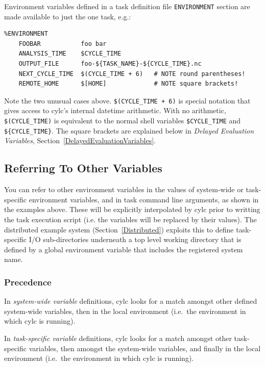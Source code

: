 \documentclass[11pt,a4paper]{article}
\begin{document}
Environment variables defined in a task definition file
\lstinline=ENVIRONMENT= section are made available
to just the one task, e.g.:

\begin{lstlisting}
%ENVIRONMENT
    FOOBAR           foo bar
    ANALYSIS_TIME    $CYCLE_TIME
    OUTPUT_FILE      foo-${TASK_NAME}-${CYCLE_TIME}.nc
    NEXT_CYCLE_TIME  $(CYCLE_TIME + 6)   # NOTE round parentheses!
    REMOTE_HOME      $[HOME]             # NOTE square brackets!
\end{lstlisting}

\lstset{language=bash}

Note the two unusual cases above. \lstinline=$(CYCLE_TIME + 6)= is 
special notation that gives access to cylc's internal datetime arithmetic.
With no arithmetic, \lstinline=$(CYCLE_TIME)= is equivalent to 
the normal shell variables \lstinline=$CYCLE_TIME= and
\lstinline=${CYCLE_TIME}=. The square brackets are explained 
below in {\em Delayed Evaluation Variables},
Section~\ref{DelayedEvaluationVariables}.

\subsection{Referring To Other Variables}
\label{ReferringToOtherVariables}

\lstset{language=bash}

You can refer to other environment variables in the values of
system-wide or task-specific environment variables, and in task command
line arguments, as shown in the examples above. These will be explicitly
interpolated by cylc prior to writting the task execution script (i.e.
the variables will be replaced by their values). The distributed example
system (Section~\ref{Distributed}) exploits this to define task-specific
I/O sub-directories underneath a top level working directory that is
defined by a global environment variable that includes the registered
system name.

\subsubsection{Precedence}

In {\em system-wide variable} definitions, cylc looks for a match
amongst other defined system-wide variables, then in the local
environment (i.e.\ the environment in which cylc is running).

In {\em task-specific variable} definitions, cylc looks for a match
amongst other task-specific variables, then amongst the system-wide
variables, and finally in the local environment (i.e.\ the environment
in which cylc is running).
\end{document}
